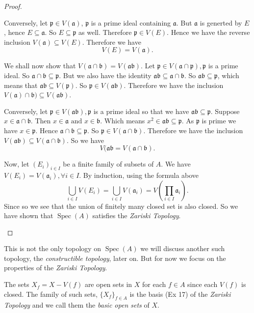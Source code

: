 \documentclass[]{report}
\DeclareMathOperator\Spec{Spec}
\begin{document}
\begin{proof}
\begin{enumerate}
        Conversely, let $\mathfrak{p} \in V(\mathfrak{a})$, $\mathfrak{p}$ is a prime ideal containing $\mathfrak{a}$. But $\mathfrak{a}$ is generted by $E$, hence $E \subseteq \mathfrak{a}$. So $E \subseteq \mathfrak{p}$ as well. Therefore $\mathfrak{p} \in V(E)$. Hence we have the reverse inclusion $V(\mathfrak{a}) \subseteq V(E)$. Therefore we have
        $$V(E) = V(\mathfrak{a}).$$

        We shall now show that $V(\mathfrak{a} \cap \mathfrak{b}) = V(\mathfrak{ab})$. Let $\mathfrak{p} \in V(\mathfrak{a} \cap \mathfrak{p}), \mathfrak{p}$ is a prime ideal. So $\mathfrak{a} \cap \mathfrak{b} \subseteq \mathfrak{p}$. But we also have the identity $\mathfrak{ab} \subseteq \mathfrak{a} \cap \mathfrak{b}$. So $\mathfrak{ab} \subseteq \mathfrak{p}$, which means that $\mathfrak{ab} \subseteq V(\mathfrak{p})$. So $\mathfrak{p} \in V(\mathfrak{ab})$. Therefore we have the inclusion $V(\mathfrak{a}) \cap \mathfrak{b}) \subseteq V(\mathfrak{ab})$.

        Conversely, let $\mathfrak{p} \in V(\mathfrak{ab}), \mathfrak{p}$ is a prime ideal so that we have $\mathfrak{ab} \subseteq \mathfrak{p}$. Suppose $x \in \mathfrak{a} \cap \mathfrak{b}$. Then $x \in \mathfrak{a} \text{ and } x \in \mathfrak{b}$. Which means $x^2 \in \mathfrak{ab} \subseteq \mathfrak{p}$. As $\mathfrak{p}$ is prime we have $x \in \mathfrak{p}$. Hence $\mathfrak{a} \cap \mathfrak{b} \subseteq \mathfrak{p}$. So $\mathfrak{p} \in V(\mathfrak{a} \cap \mathfrak{b})$. Therefore we have the inclusion $V(\mathfrak{ab}) \subseteq V(\mathfrak{a} \cap \mathfrak{b})$. So we have
        $$V(\mathfrak{ab} = V(\mathfrak{a} \cap \mathfrak{b}).$$


        Now, let $(E_i)_{i \in I}$ be a finite family of subsets of $A$. We have $V(E_i) = V(\mathfrak{a}_i), \forall i \in I$. By induction, using the formula above 
        $$\bigcup_{i \in I} V(E_i) = \bigcup_{i \in I} V(\mathfrak{a}_i) = V(\prod_{i \in I} \mathfrak{a}_i).$$
        Since so we see that the union of finitely many closed set is also closed. So we have shown that $\Spec(A)$ satisfies the \textit{Zariski Topology}.
\end{enumerate}
\end{proof}

    This is not the only topology on $\Spec(A)$ we will discuss another such topology, the \textit{constructible topology}, later on. But for now we focus on the properties of the \textit{Zariski Topology}.

    The sets $X_f = X - V(f)$ are open sets in $X$ for each $f\in A$ since each $V(f)$ is closed. The family of such sets, $\{X_f\}_{f\in A}$ is the basis (Ex 17) of the \textit{Zariski Topology} and we call them the \textit{basic open sets} of $X$.
\end{document}
